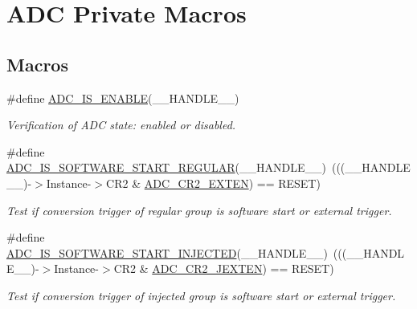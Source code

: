 \hypertarget{group___a_d_c___private___macros}{}\section{A\+DC Private Macros}
\label{group___a_d_c___private___macros}
\subsection*{Macros}
\begin{DoxyCompactItemize}
\item 
\#define \mbox{\hyperlink{group___a_d_c___private___macros_gafe3a7a04ff078c62ae98b19403f696c7}{A\+D\+C\+\_\+\+I\+S\+\_\+\+E\+N\+A\+B\+LE}}(\+\_\+\+\_\+\+H\+A\+N\+D\+L\+E\+\_\+\+\_\+)
\begin{DoxyCompactList}\small\item\em Verification of A\+DC state\+: enabled or disabled. \end{DoxyCompactList}\item 
\#define \mbox{\hyperlink{group___a_d_c___private___macros_ga2ccb82ecf85d6c6d1ff2cdf9b6a82d2b}{A\+D\+C\+\_\+\+I\+S\+\_\+\+S\+O\+F\+T\+W\+A\+R\+E\+\_\+\+S\+T\+A\+R\+T\+\_\+\+R\+E\+G\+U\+L\+AR}}(\+\_\+\+\_\+\+H\+A\+N\+D\+L\+E\+\_\+\+\_\+)~(((\+\_\+\+\_\+\+H\+A\+N\+D\+L\+E\+\_\+\+\_\+)-\/$>$Instance-\/$>$C\+R2 \& \mbox{\hyperlink{group___peripheral___registers___bits___definition_ga574b4d8e90655d0432882d620e629234}{A\+D\+C\+\_\+\+C\+R2\+\_\+\+E\+X\+T\+EN}}) == R\+E\+S\+ET)
\begin{DoxyCompactList}\small\item\em Test if conversion trigger of regular group is software start or external trigger. \end{DoxyCompactList}\item 
\#define \mbox{\hyperlink{group___a_d_c___private___macros_gaa3a1c2197a097b9bb8159b6eb1ac8941}{A\+D\+C\+\_\+\+I\+S\+\_\+\+S\+O\+F\+T\+W\+A\+R\+E\+\_\+\+S\+T\+A\+R\+T\+\_\+\+I\+N\+J\+E\+C\+T\+ED}}(\+\_\+\+\_\+\+H\+A\+N\+D\+L\+E\+\_\+\+\_\+)~(((\+\_\+\+\_\+\+H\+A\+N\+D\+L\+E\+\_\+\+\_\+)-\/$>$Instance-\/$>$C\+R2 \& \mbox{\hyperlink{group___peripheral___registers___bits___definition_ga07330f702208792faca3a563dc4fd9c6}{A\+D\+C\+\_\+\+C\+R2\+\_\+\+J\+E\+X\+T\+EN}}) == R\+E\+S\+ET)
\begin{DoxyCompactList}\small\item\em Test if conversion trigger of injected group is software start or external trigger. \end{DoxyCompactList}\item 

\end{DoxyCompactItemize}
